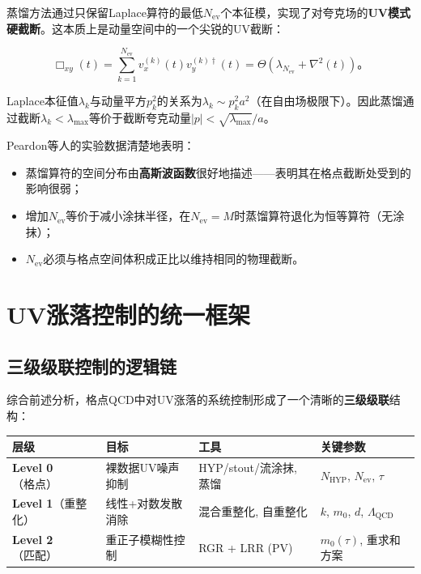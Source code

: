 \documentclass[12pt,a4paper]{ctexart}
\theoremstyle{definition}
\begin{document}
蒸馏方法\cite{Peardon2009}通过只保留Laplace算符的最低$N_{\text{ev}}$个本征模，实现了对夸克场的\textbf{UV模式硬截断}。这本质上是动量空间中的一个尖锐的UV截断：

\begin{equation}
\Box_{xy}(t) = \sum_{k=1}^{N_{\text{ev}}} v^{(k)}_x(t) v^{(k)\dagger}_y(t) = \Theta(\lambda_{N_{\text{ev}}} + \nabla^2(t))。
\label{eq:distillation_UV_cut}
\end{equation}

Laplace本征值$\lambda_k$与动量平方$p^2_k$的关系为$\lambda_k \sim p^2_k a^2$（在自由场极限下）。因此蒸馏通过截断$\lambda_k < \lambda_{\text{max}}$等价于截断夸克动量$|p| < \sqrt{\lambda_{\text{max}}}/a$。

Peardon等人\cite{Peardon2009}的实验数据清楚地表明：
\begin{itemize}
    \item 蒸馏算符的空间分布由\textbf{高斯波函数}很好地描述——表明其在格点截断处受到的影响很弱；
    \item 增加$N_{\text{ev}}$等价于减小涂抹半径，在$N_{\text{ev}} = M$时蒸馏算符退化为恒等算符（无涂抹）；
    \item $N_{\text{ev}}$必须与格点空间体积成正比以维持相同的物理截断。
\end{itemize}

\section{UV涨落控制的统一框架}

\subsection{三级级联控制的逻辑链}

综合前述分析，格点QCD中对UV涨落的系统控制形成了一个清晰的\textbf{三级级联}结构：

\begin{center}
\begin{tabular}{lp{3cm}p{3cm}p{3cm}}
\toprule
层级 & 目标 & 工具 & 关键参数 \\
\midrule
\textbf{Level 0}（格点）& 裸数据UV噪声抑制 & HYP/stout/流涂抹, 蒸馏 & $N_{\text{HYP}}$, $N_{\text{ev}}$, $\tau$ \\
\textbf{Level 1}（重整化）& 线性+对数发散消除 & 混合重整化, 自重整化 & $k$, $m_0$, $d$, $\Lambda_{\text{QCD}}$ \\
\textbf{Level 2}（匹配）& 重正子模糊性控制 & RGR + LRR (PV) & $m_0(\tau)$, 重求和方案 \\
\bottomrule
\end{tabular}
\end{center}
\end{document}
